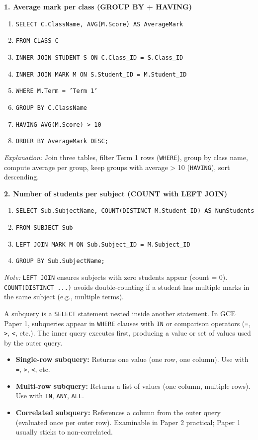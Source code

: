 \documentclass[11pt]{article}
\newcommand{\cle}[1]{{\popxbold\color{popdark}#1}}
\newcounter{popsec}
\newcounter{popsub}
\newcommand{\courssub}[1]{%
  \stepcounter{popsub}%
  \par\vspace{9pt}\noindent{\popxbold\fontsize{11.5}{13}\selectfont\color{popink}{\color{poporange}\thepopsec.\thepopsub}\hspace{6pt}#1}\par\nopagebreak\vspace{4pt}
}
\begin{document}
\begin{exemplebox}
\textbf{1. Average mark per class (GROUP BY + HAVING)}
\begin{enumerate}
\item \texttt{SELECT C.ClassName, AVG(M.Score) AS AverageMark}
\item \texttt{FROM CLASS C}
\item \texttt{INNER JOIN STUDENT S ON C.Class\_ID = S.Class\_ID}
\item \texttt{INNER JOIN MARK M ON S.Student\_ID = M.Student\_ID}
\item \texttt{WHERE M.Term = 'Term 1'}
\item \texttt{GROUP BY C.ClassName}
\item \texttt{HAVING AVG(M.Score) > 10}
\item \texttt{ORDER BY AverageMark DESC;}
\end{enumerate}
\textit{Explanation:} Join three tables, filter Term 1 rows (\texttt{WHERE}), group by class name, compute average per group, keep groups with average > 10 (\texttt{HAVING}), sort descending.

\textbf{2. Number of students per subject (COUNT with LEFT JOIN)}
\begin{enumerate}
\item \texttt{SELECT Sub.SubjectName, COUNT(DISTINCT M.Student\_ID) AS NumStudents}
\item \texttt{FROM SUBJECT Sub}
\item \texttt{LEFT JOIN MARK M ON Sub.Subject\_ID = M.Subject\_ID}
\item \texttt{GROUP BY Sub.SubjectName;}
\end{enumerate}
\textit{Note:} \texttt{LEFT JOIN} ensures subjects with zero students appear (count = 0). \texttt{COUNT(DISTINCT ...)} avoids double-counting if a student has multiple marks in the same subject (e.g., multiple terms).
\end{exemplebox}

\courssub{Nested Queries (Subqueries)}

A \cle{subquery} is a \texttt{SELECT} statement nested inside another statement. In GCE Paper 1, subqueries appear in \texttt{WHERE} clauses with \texttt{IN} or comparison operators (\texttt{=}, \texttt{>}, \texttt{<}, etc.). The inner query executes first, producing a value or set of values used by the outer query.

\begin{aretenir}
\begin{itemize}
\item \textbf{Single-row subquery:} Returns one value (one row, one column). Use with \texttt{=}, \texttt{>}, \texttt{<}, etc.
\item \textbf{Multi-row subquery:} Returns a list of values (one column, multiple rows). Use with \texttt{IN}, \texttt{ANY}, \texttt{ALL}.
\item \textbf{Correlated subquery:} References a column from the outer query (evaluated once per outer row). Examinable in Paper 2 practical; Paper 1 usually sticks to non-correlated.
\end{itemize}
\end{aretenir}
\end{document}
